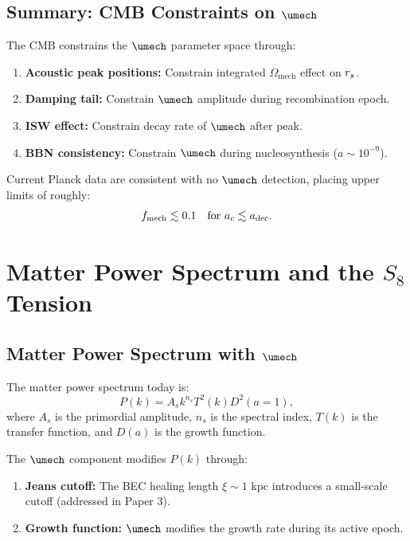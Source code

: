 \subsection{Summary: CMB Constraints on $\umech$}
\label{sec:cmb_summary}

The CMB constrains the $\umech$ parameter space through:
\begin{enumerate}
\item \textbf{Acoustic peak positions:} Constrain integrated $\Omega_{\mathrm{mech}}$ effect on $r_s$.
\item \textbf{Damping tail:} Constrain $\umech$ amplitude during recombination epoch.
\item \textbf{ISW effect:} Constrain decay rate of $\umech$ after peak.
\item \textbf{BBN consistency:} Constrain $\umech$ during nucleosynthesis ($a \sim 10^{-9}$).
\end{enumerate}

Current Planck data are consistent with no $\umech$ detection, placing upper limits of roughly:
\begin{equation}
f_{\mathrm{mech}} \lesssim 0.1 \quad \text{for } a_c \lesssim a_{\mathrm{dec}}.
\end{equation}



\section{Matter Power Spectrum and the $S_8$ Tension}
\label{sec:matter_spectrum}

\subsection{Matter Power Spectrum with $\umech$}
\label{sec:Pk_mech}

The matter power spectrum today is:
\begin{equation}
P(k) = A_s k^{n_s} T^2(k) D^2(a=1),
\end{equation}
where $A_s$ is the primordial amplitude, $n_s$ is the spectral index, $T(k)$ is the transfer function, and $D(a)$ is the growth function.

The $\umech$ component modifies $P(k)$ through:
\begin{enumerate}
\item \textbf{Jeans cutoff:} The BEC healing length $\xi \sim 1$ kpc introduces a small-scale cutoff (addressed in Paper 3).
\item \textbf{Growth function:} $\umech$ modifies the growth rate during its active epoch.
\end{enumerate}

